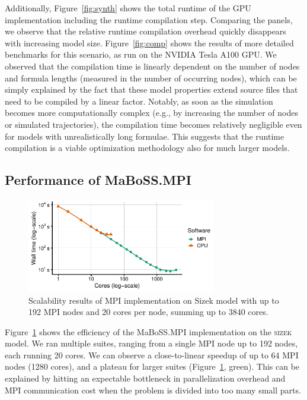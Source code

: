 \documentclass[sn-mathphys-num]{sn-jnl}%
\begin{document}
Additionally, Figure~\ref{fig:synth} shows the total runtime of the GPU implementation including the runtime compilation step. Comparing the panels, we observe that the relative runtime compilation overhead quickly disappears with increasing model size. Figure~\ref{fig:comp} shows the results of more detailed benchmarks for this scenario, as run on the NVIDIA Tesla A100 GPU. We observed that the compilation time is linearly dependent on the number of nodes and formula lengths (measured in the number of occurring nodes), which can be simply explained by the fact that these model properties extend source files that need to be compiled by a linear factor. Notably, as soon as the simulation becomes more computationally complex (e.g., by increasing the number of nodes or simulated trajectories), the compilation time becomes relatively negligible even for models with unrealistically long formulae. This suggests that the runtime compilation is a viable optimization methodology also for much larger models.

\subsection{Performance of MaBoSS.MPI}


\begin{figure}%
\centering
\includegraphics[width=3.25in]{plots/sizek_mpi.pdf}
\caption{Scalability results of MPI implementation on Sizek model with up to 192 MPI nodes and 20 cores per node, summing up to 3840 cores.}
\label{fig:sizek_results}
\end{figure}

Figure~\ref{fig:sizek_results} shows the efficiency of the MaBoSS.MPI implementation on the \textsc{sizek} model. We ran multiple suites, ranging from a single MPI node up to 192 nodes, each running 20 cores. We can observe a close-to-linear speedup of up to 64 MPI nodes (1280 cores), and a plateau for larger suites (Figure~\ref{fig:sizek_results}, green). This can be explained by hitting an expectable bottleneck in parallelization overhead and MPI communication cost when the problem is divided into too many small parts.
\end{document}
